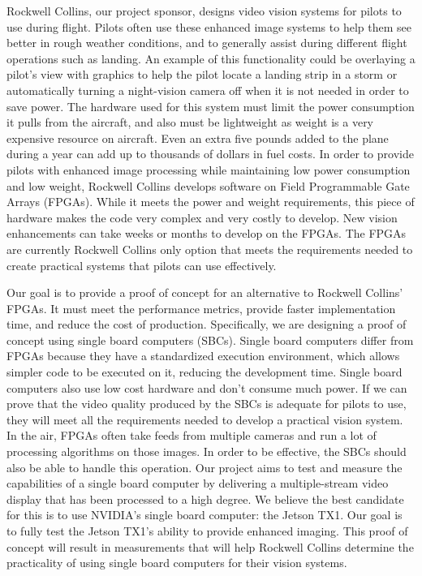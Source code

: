 Rockwell Collins, our project sponsor, designs video vision systems for pilots to use during flight. Pilots often use these enhanced image systems to help them see better in rough weather conditions, and to generally assist during different flight operations such as landing. An example of this functionality could be overlaying a pilot's view with graphics to help the pilot locate a landing strip in a storm or automatically turning a night-vision camera off when it is not needed in order to save power. The hardware used for this system must limit the power consumption it pulls from the aircraft, and also must be lightweight as weight is a very expensive resource on aircraft. Even an extra five pounds added to the plane during a year can add up to thousands of dollars in fuel costs. In order to provide pilots with enhanced image processing while maintaining low power consumption and low weight, Rockwell Collins develops software on Field Programmable Gate Arrays (FPGAs). While it meets the power and weight requirements, this piece of hardware makes the code very complex and very costly to develop. New vision enhancements can take weeks or months to develop on the FPGAs. The FPGAs are currently Rockwell Collins only option that meets the requirements needed to create practical systems that pilots can use effectively.\\
\par
Our goal is to provide a proof of concept for an alternative to Rockwell Collins' FPGAs. It must meet the performance metrics, provide faster implementation time, and reduce the cost of production. Specifically, we are designing a proof of concept using single board computers (SBCs). Single board computers differ from FPGAs because they have a standardized execution environment, which allows simpler code to be executed on it, reducing the development time. Single board computers also use low cost hardware and don't consume much power. If we can prove that the video quality produced by the SBCs is adequate for pilots to use, they will meet all the requirements needed to develop a practical vision system. In the air, FPGAs often take feeds from multiple cameras and run a lot of processing algorithms on those images. In order to be effective, the SBCs should also be able to handle this operation. Our project aims to test and measure the capabilities of a single board computer by delivering a multiple-stream video display that has been processed to a high degree. We believe the best candidate for this is to use NVIDIA's single board computer: the Jetson TX1. Our goal is to fully test the Jetson TX1's ability to provide enhanced imaging. This proof of concept will result in measurements that will help Rockwell Collins determine the practicality of using single board computers for their vision systems.\\
